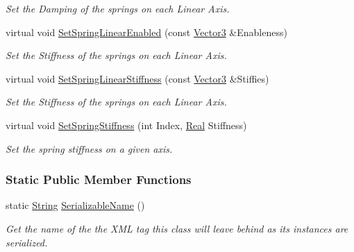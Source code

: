 \begin{DoxyCompactItemize}
\begin{DoxyCompactList}\small\item\em Set the Damping of the springs on each Linear Axis. \item\end{DoxyCompactList}\item 
virtual void \hyperlink{classMezzanine_1_1Generic6DofSpringConstraint_aa166925f112f031ab8927d6a2af4f938}{SetSpringLinearEnabled} (const \hyperlink{classMezzanine_1_1Vector3}{Vector3} \&Enableness)
\begin{DoxyCompactList}\small\item\em Set the Stiffness of the springs on each Linear Axis. \item\end{DoxyCompactList}\item 
virtual void \hyperlink{classMezzanine_1_1Generic6DofSpringConstraint_a1ad3bbe259be7d902b299568bd583cbd}{SetSpringLinearStiffness} (const \hyperlink{classMezzanine_1_1Vector3}{Vector3} \&Stiffies)
\begin{DoxyCompactList}\small\item\em Set the Stiffness of the springs on each Linear Axis. \item\end{DoxyCompactList}\item 
virtual void \hyperlink{classMezzanine_1_1Generic6DofSpringConstraint_ac3399694dcabcf63a4e475b4d3537e2b}{SetSpringStiffness} (int Index, \hyperlink{namespaceMezzanine_a726731b1a7df72bf3583e4a97282c6f6}{Real} Stiffness)
\begin{DoxyCompactList}\small\item\em Set the spring stiffness on a given axis. \item\end{DoxyCompactList}\end{DoxyCompactItemize}
\subsubsection*{Static Public Member Functions}
\begin{DoxyCompactItemize}
\item 
static \hyperlink{namespaceMezzanine_acf9fcc130e6ebf08e3d8491aebcf1c86}{String} \hyperlink{classMezzanine_1_1Generic6DofSpringConstraint_aa020b0ef38e950475dc8a36f06139933}{SerializableName} ()
\begin{DoxyCompactList}\small\item\em Get the name of the the XML tag this class will leave behind as its instances are serialized. \item\end{DoxyCompactList}\end{DoxyCompactItemize}
